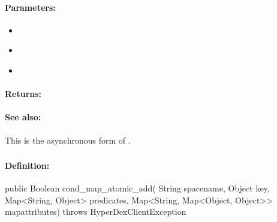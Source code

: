 \paragraph{Parameters:}
\begin{itemize}[noitemsep]
\item {}\\

\item {}\\

\item {}\\

\end{itemize}

\paragraph{Returns:}


\paragraph{See also:}  This is the asynchronous form of .

\pagebreak
\subsubsection{}
\label{api:java:cond_map_atomic_add}


\paragraph{Definition:}
\begin{javacode}
public Boolean cond_map_atomic_add(
        String spacename,
        Object key,
        Map<String, Object> predicates,
        Map<String, Map<Object, Object>> mapattributes) throws HyperDexClientException
\end{javacode}

